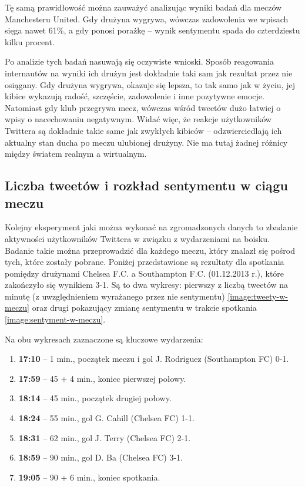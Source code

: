 Tę samą prawidłowość można zauważyć analizując wyniki badań dla meczów
Manchesteru United. Gdy drużyna wygrywa, wówczas zadowolenia we wpisach sięga
nawet 61\%, a gdy ponosi porażkę -- wynik sentymentu spada do czterdziestu kilku
procent.

Po analizie tych badań nasuwają się oczywiste wnioski. Sposób reagowania
internautów na wyniki ich drużyn jest dokładnie taki sam jak rezultat przez nie
osiągany. Gdy drużyna wygrywa, okazuje się lepsza, to tak samo jak w życiu, jej
kibice wykazują radość, szczęście, zadowolenie i inne pozytywne emocje.
Natomiast gdy klub przegrywa mecz, wówczas wśród tweetów dużo łatwiej o wpisy o
nacechowaniu negatywnym. Widać więc, że reakcje użytkowników Twittera są
dokładnie takie same jak zwykłych kibiców -- odzwierciedlają ich aktualny stan
ducha po meczu ulubionej drużyny. Nie ma tutaj żadnej różnicy między światem
realnym a wirtualnym.















\subsection{Liczba tweetów i rozkład sentymentu w ciągu meczu}
Kolejny eksperyment jaki można wykonać na zgromadzonych danych
to zbadanie aktywności użytkowników Twittera w związku z wydarzeniami 
na boisku. Badanie takie można przeprowadzić dla każdego meczu, który znalazł 
się pośrod tych, które zostały pobrane. Poniżej przedstawione są rezultaty
dla spotkania pomiędzy drużynami Chelsea F.C. a Southampton F.C. (01.12.2013 r.),
które zakończyło się wynikiem 3-1. Są to dwa wykresy: pierwszy z liczbą tweetów
na minutę (z uwzględnieniem wyrażanego przez nie sentymentu) 
\ref{image:tweety-w-meczu} oraz drugi pokazujący zmianę sentymentu w trakcie
spotkania \ref{image:sentyment-w-meczu}.

Na obu wykresach zaznaczone są kluczowe wydarzenia:

\begin{enumerate}
  \item \textbf{17:10} -- 1 min., początek meczu i gol J. Rodriguez (Southampton FC) 0-1.
  \item \textbf{17:59} -- 45 + 4 min., koniec pierwszej połowy.
  \item \textbf{18:14} -- 45 min., początek drugiej połowy.
  \item \textbf{18:24} -- 55 min., gol G. Cahill (Chelsea FC) 1-1.
  \item \textbf{18:31} -- 62 min., gol J. Terry (Chelsea FC) 2-1.
  \item \textbf{18:59} -- 90 min., gol D. Ba (Chelsea FC) 3-1.
  \item \textbf{19:05} -- 90 + 6 min., koniec spotkania.
\end{enumerate}



